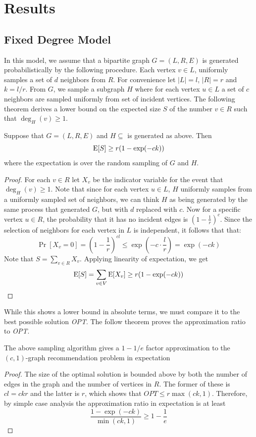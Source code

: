\section{Results}
\subsection{Fixed Degree Model}
\label{fixed-degree}

In this model, we assume that a bipartite graph $G=(L,R,E)$ is
generated probabilistically by the following procedure. Each
vertex $v\in L$, uniformly samples a set of $d$ neighbors
from $R$. For convenience let $|L|=l$, $|R|=r$ and $k=l/r$. From
$G$, we sample a subgraph $H$ where for each vertex $u\in L$ a set of
$c$ neighbors are sampled uniformly from set of incident vertices. The
following theorem derives a lower bound on the expected size $S$ of the
number $v\in R$ such that $\deg_H(v) \geq 1$.

\begin{thm}
Suppose that $G=(L,R,E)$ and $H\subseteq$ is generated as above. Then
\[ \text{E}[S] \geq r(1-\exp(-ck))\]
where the expectation is over the random sampling of $G$ and $H$.
\end{thm}
\begin{proof}
For each $v\in R$ let $X_v$ be the indicator variable for the event
that $\deg_H(v) \geq 1$. Note that since for each vertex $u\in L$, $H$
uniformly samples from a uniformly sampled set of neighbors, we can
think $H$ as being generated by the same process that generated $G$,
but with $d$ replaced with $c$. Now for a specific vertex $u \in R$,
the probability that it has no incident edges is 
$\left(1-\frac{1}{r}\right)^c$. Since the selection of neighbors for each 
vertex in $L$ is independent, it follows that that:
\[ \Pr[X_v=0] = \left(1-\frac{1}{r}\right)^{cl} \leq \exp\left(-c \cdot \frac{l}{r}\right) = \exp(-ck) \]
Note that $S = \sum_{v\in R} X_v$. Applying linearity of expectation, we get
\[ \text{E}[S] = \sum_{v\in V} \text{E}[X_v] \geq r(1-\exp(-ck))\]
\end{proof}

While this shows a lower bound in absolute terms, we must compare it to the best possible solution {\em OPT}. The follow theorem proves the approximation ratio to {\em OPT}.

\begin{thm}
The above sampling algorithm gives a $1-1/e$ factor approximation to the $(c,1)$-graph recommendation problem in expectation
\end{thm}
\begin{proof}
The size of the optimal solution is bounded above by both the number
of edges in the graph and the number of vertices in $R$. The former of
these is $cl=ckr$ and the latter is $r$, which shows that $OPT \leq
r\max(ck,1)$. Therefore, by simple case analysis the approximation ratio in
expectation is at least
\[ \frac{1-\exp(-ck)}{\min(ck,1)} \geq 1-\frac{1}{e} \]
\end{proof}

